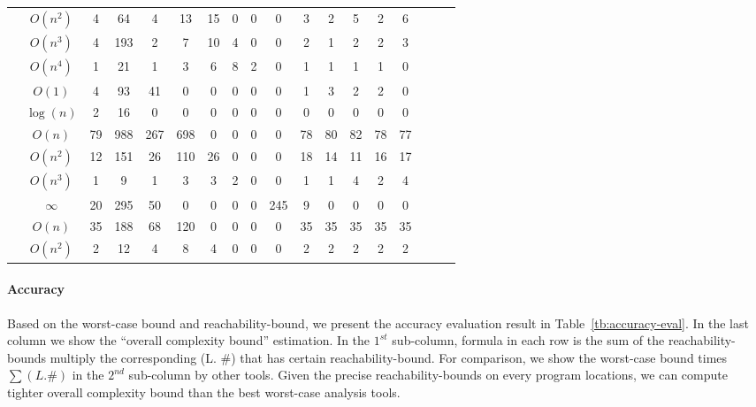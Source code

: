 \begin{table}[ht]
{\begin{tabular}{ | >{\scriptsize}c | >{\scriptsize}c | >{\scriptsize}c | >{\scriptsize}c | >{\scriptsize}c | c | c | c | c | c | c | c | c | c | c | c | c | c |}
    \cline{2-2}
    & $O(n^2)$   & 4 & 64 & 4 & 13 & 15 & 0 & 0 & 0 & 3 & 2 & 5 & 2 & 6 \\
    \cline{2-2}
    & $O(n^3)$   & 4 & 193 & 2 & 7 & 10 & 4 & 0 & 0 & 2 & 1 & 2 & 2 & 3 \\
    \cline{2-2}
    & $O(n^{4})$ & 1 & 21 & 1 & 3 & 6 & 8 & 2 & 0 & 1 & 1 & 1 & 1 & 0 \\
    \hline \hline
    \multirow{6}{*}{Icra} 
    & $O(1)$ & 4 & 93 & 41 & 0 & 0 & 0 & 0 & 0 & 1 & 3 & 2 & 2 & 0  \\
    \cline{2-2}
    & $\log(n)$ & 2 & 16 & 0 & 0 & 0 & 0 & 0 & 0 & 0 & 0 & 0 & 0 & 0   \\
    \cline{2-2}
    & $O(n)$ & 79 & 988 & 267 & 698 & 0 & 0 & 0 & 0 & 78 & 80 & 82 & 78 & 77  \\
    \cline{2-2}
    & $O(n^2)$ & 12 & 151 & 26 & 110 & 26 & 0 & 0 & 0 & 18 & 14 & 11 & 16 & 17  \\
    \cline{2-2}
    & $O(n^3)$ & 1 &  9 & 1 & 3 & 3 & 2 & 0 & 0 & 1 & 1 & 4 & 2 & 4  \\
    \cline{2-2}
    & $\infty$ & 20 & 295 &  50 & 0 & 0 & 0 & 0 & 245 & 9 & 0 & 0 & 0 & 0  \\
    \hline \hline
    \multirow{2}{*}{Tianhan} 
    & $O(n)$ & 35 & 188 & 68 & 120 & 0 & 0 & 0 & 0 & 35 & 35 & 35 & 35 & 35  \\
    \cline{2-2}
    & $O(n^2)$ & 2 & 12 & 4 & 8 & 4 & 0 & 0 & 0 & 2 & 2 & 2 & 2 & 2   \\
    \hline
    \hline
    \end{tabular}
    }
    \end{table}

\paragraph{Accuracy}
Based on the worst-case bound and reachability-bound, we present the accuracy evaluation result in
Table~\ref{tb:accuracy-eval}.
In the last column we show the ``overall complexity bound'' estimation.
In the $1^{st}$ sub-column, formula in each row is the sum of the reachability-bounds multiply the corresponding (L. \#) that has certain reachability-bound.
For comparison, we show the worst-case bound times $\sum(L. \#)$ in the $2^{nd}$ sub-column by other tools. Given the precise reachability-bounds on every program locations, we can compute tighter overall complexity bound than the best worst-case analysis tools.

